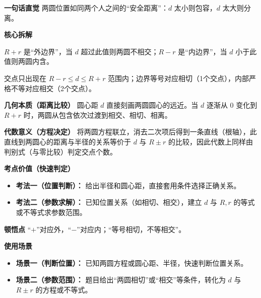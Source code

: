 \begin{explanationbox}
	\textbf{\textcolor{CExplanation}{一句话直觉}}
	两圆位置如同两个人之间的“安全距离”：$d$ 太小则包容，$d$ 太大则分离。

	\medskip
	\textbf{\textcolor{CExplanation}{核心拆解}}
	\begin{description}[style=nextline, leftmargin=2.8em, labelsep=0.5em, itemsep=0.45em]
		\item[\textbf{要点一（半径和差）：}]
			$R+r$ 是“外边界”，当 $d$ 超过此值则两圆不相交；$R-r$ 是“内边界”，当 $d$ 小于此值则两圆内含。
		\item[\textbf{要点二（交点个数）：}]
			交点只出现在 $R-r \le d \le R+r$ 范围内；边界等号对应相切（1个交点），内部严格不等对应相交（2个交点）。
	\end{description}

	\medskip
	\textbf{\textcolor{CExplanation}{几何本质（距离比较）}}
	圆心距 $d$ 直接刻画两圆圆心的远近。当 $d$ 逐渐从 $0$ 变化到 $R+r$ 时，两圆从包含依次过渡到相交、相切、相离。

	\medskip
	\textbf{\textcolor{CExplanation}{代数意义（方程决定）}}
	将两圆方程联立，消去二次项后得到一条直线（根轴），此直线到两圆心的距离与半径的关系等价于 $d$ 与 $R\pm r$ 的比较，因此代数上同样由判别式（与零比较）判定交点个数。

	\medskip
	\textbf{\textcolor{CExplanation}{考点价值（快速判定）}}
	\begin{itemize}[leftmargin=*, itemsep=0.5em, topsep=0.4em]
		\item \textbf{考法一（位置判断）：} 给出半径和圆心距，直接套用条件选择正确关系。
		\item \textbf{考法二（参数求解）：} 已知位置关系（如相切、相交），建立 $d$ 与 $R,r$ 的等式或不等式求参数范围。
	\end{itemize}

	\medskip
	\textbf{\textcolor{CExplanation}{顿悟点}}
	“$+$”对应外，“$-$”对应内；“等号相切，不等相交”。

	\medskip
	\textbf{\textcolor{CExplanation}{使用场景}}
	\begin{itemize}[leftmargin=*, itemsep=0.5em, topsep=0.4em]
		\item \textbf{场景一（判断位置）：} 已知两圆方程或圆心距、半径，快速判断位置关系。
		\item \textbf{场景二（参数范围）：} 题目给出“两圆相切”或“相交”等条件，转化为 $d$ 与 $R\pm r$ 的方程或不等式。
	\end{itemize}

\end{explanationbox}

